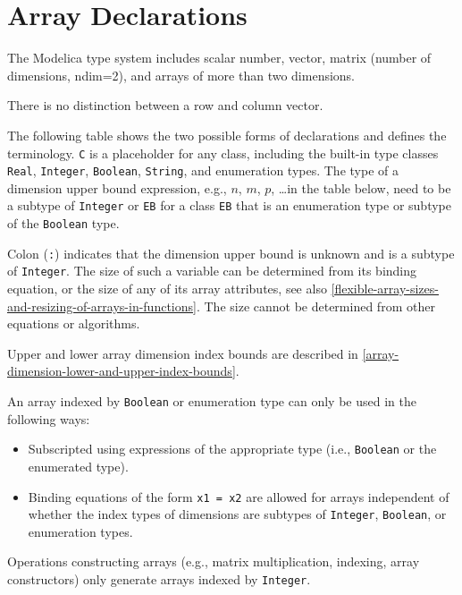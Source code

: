 \section{Array Declarations}\label{array-declarations}

The Modelica type system includes scalar number, vector, matrix (number of dimensions, ndim=2), and arrays of more than two dimensions.

\begin{nonnormative}
There is no distinction between a row and column vector.
\end{nonnormative}

The following table shows the two possible forms of declarations and defines the terminology.
\lstinline!C! is a placeholder for any class, including the built-in type classes \lstinline!Real!, \lstinline!Integer!, \lstinline!Boolean!, \lstinline!String!, and enumeration types.
The type of a dimension upper bound expression, e.g., $n$, $m$, $p$, \ldots in the table below, need to be a subtype of \lstinline!Integer! or \lstinline!EB! for a class \lstinline!EB! that is an enumeration type or subtype of the \lstinline!Boolean! type.

Colon (\lstinline!:!) indicates that the dimension upper bound is unknown and is a subtype of \lstinline!Integer!.
The size of such a variable can be determined from its binding equation, or the size of any of its array attributes, see also \cref{flexible-array-sizes-and-resizing-of-arrays-in-functions}.
The size cannot be determined from other equations or algorithms.

Upper and lower array dimension index bounds are described in \cref{array-dimension-lower-and-upper-index-bounds}.

An array indexed by \lstinline!Boolean! or enumeration type can only be used in the following ways:
\begin{itemize}
\item
  Subscripted using expressions of the appropriate type (i.e., \lstinline!Boolean! or the enumerated type).
\item
  Binding equations of the form \lstinline!x1 = x2! are allowed for arrays independent of whether the index types of dimensions are subtypes of \lstinline!Integer!, \lstinline!Boolean!, or enumeration types.
\end{itemize}
Operations constructing arrays (e.g., matrix multiplication, indexing, array constructors) only generate arrays indexed by \lstinline!Integer!.

